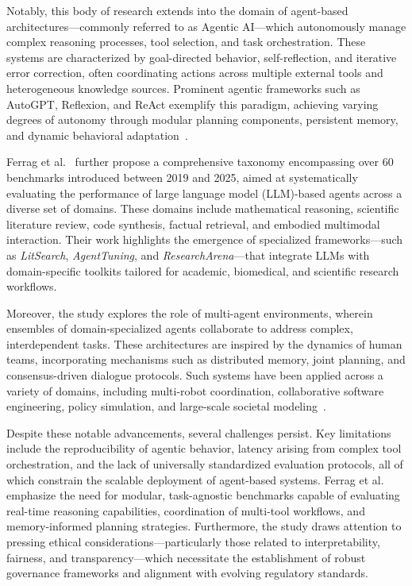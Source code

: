 \vspace{0.5cm}

Notably, this body of research extends into the domain of agent-based architectures—commonly referred to as Agentic AI—which autonomously manage complex reasoning processes, tool selection, and task orchestration. These systems are characterized by goal-directed behavior, self-reflection, and iterative error correction, often coordinating actions across multiple external tools and heterogeneous knowledge sources. Prominent agentic frameworks such as AutoGPT, Reflexion, and ReAct exemplify this paradigm, achieving varying degrees of autonomy through modular planning components, persistent memory, and dynamic behavioral adaptation~\cite{autogpt2023,reflexion2023,react2022}.

\vspace{0.5cm}

Ferrag et al.~\cite{ferrag2025can} further propose a comprehensive taxonomy encompassing over 60 benchmarks introduced between 2019 and 2025, aimed at systematically evaluating the performance of large language model (LLM)-based agents across a diverse set of domains. These domains include mathematical reasoning, scientific literature review, code synthesis, factual retrieval, and embodied multimodal interaction. Their work highlights the emergence of specialized frameworks—such as \textit{LitSearch}, \textit{AgentTuning}, and \textit{ResearchArena}—that integrate LLMs with domain-specific toolkits tailored for academic, biomedical, and scientific research workflows.

\vspace{0.5cm}

Moreover, the study explores the role of multi-agent environments, wherein ensembles of domain-specialized agents collaborate to address complex, interdependent tasks. These architectures are inspired by the dynamics of human teams, incorporating mechanisms such as distributed memory, joint planning, and consensus-driven dialogue protocols. Such systems have been applied across a variety of domains, including multi-robot coordination, collaborative software engineering, policy simulation, and large-scale societal modeling~\cite{multiagent2024,autoteams2023,collective2025}.

\vspace{0.5cm}


Despite these notable advancements, several challenges persist. Key limitations include the reproducibility of agentic behavior, latency arising from complex tool orchestration, and the lack of universally standardized evaluation protocols, all of which constrain the scalable deployment of agent-based systems. Ferrag et al.~\cite{ferrag2025can} emphasize the need for modular, task-agnostic benchmarks capable of evaluating real-time reasoning capabilities, coordination of multi-tool workflows, and memory-informed planning strategies. Furthermore, the study draws attention to pressing ethical considerations—particularly those related to interpretability, fairness, and transparency—which necessitate the establishment of robust governance frameworks and alignment with evolving regulatory standards.

